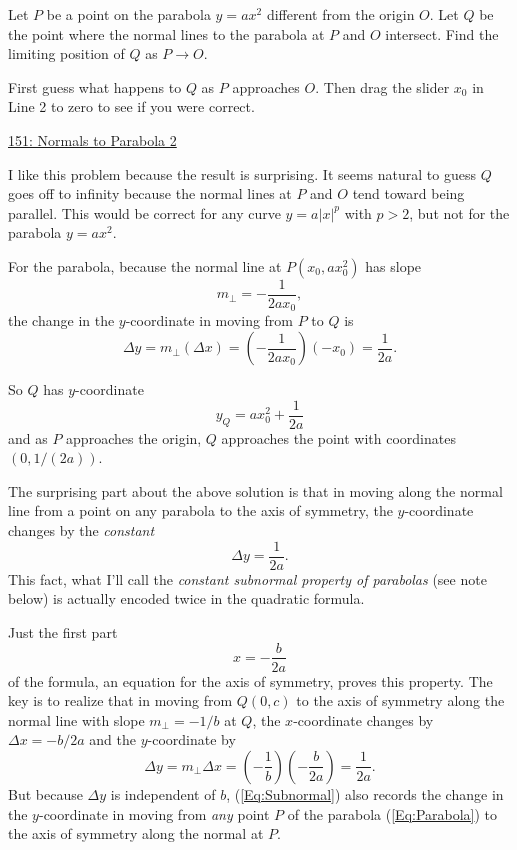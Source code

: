 \documentclass{ximera}
\begin{document}
\begin{exercise}
Let $P$ be a point on the parabola $y=ax^2$ different from the origin $O$. Let $Q$ be the point where the normal lines to the parabola at $P$ and $O$ intersect. Find the limiting position of $Q$ as $P\to O$.

\begin{exploration}
First guess what happens to $Q$ as $P$ approaches $O$. Then drag the slider $x_0$ in Line 2 to zero to see if you were correct.
\begin{onlineOnly}
    \begin{center}
\end{center}
\end{onlineOnly}

\href{https://www.desmos.com/calculator/wuazgkeukm}{151: Normals to Parabola 2}
\end{exploration}

\begin{explanation}
I like this problem because the result is surprising. It seems natural to guess $Q$ goes off to infinity because the normal lines at $P$ and $O$ tend toward being parallel. This would be correct for any curve $y=a|x|^p$ with $p>2$, but not for the parabola $y=ax^2$.

For the parabola, because the normal line at $P(x_0,ax_0^2)$ has slope
\[
        m_\perp = -\frac{1}{2ax_0} ,
\] 
the change in the $y$-coordinate in moving from $P$ to $Q$ is %
\[
 \Delta y =  m_\perp (\Delta x) =  \left( -\frac{1}{2ax_0}\right)(-x_0)  = \frac{1}{2a} .
\]

So $Q$ has $y$-coordinate
\[
     y_Q = ax_0^2 + \frac{1}{2a}
\]
and as $P$ approaches the origin, $Q$ approaches the point with coordinates $(0,1/(2a))$.
\end{explanation}
\end{exercise}

The surprising part about the above solution is that in moving along the normal line from a point on any parabola to the axis of symmetry, the $y$-coordinate changes by the \emph{constant}
\[
   \Delta y = \frac{1}{2a} .
\]
This fact, what I'll call the \emph{constant subnormal property of parabolas} (see note below) is actually encoded twice in the quadratic formula. 

Just the first part 
\[
    x = -\frac{b}{2a}
\]
of the formula, an equation for the axis of symmetry, proves this property. The key is to realize that in moving from $Q(0,c)$ to the axis of symmetry along the normal line with slope $m_\perp = -1/b$ at $Q$, the $x$-coordinate changes by $\Delta x = -b/2a$ and the $y$-coordinate by
\begin{equation}
 \Delta y = m_\perp \Delta x = \left( -\frac{1}{b}\right) \left(- \frac{b}{2a}  \right)= \frac{1}{2a} .  \label{Eq:Subnormal}
\end{equation}
But because $\Delta y$ is independent of $b$, (\ref{Eq:Subnormal}) also records the change in the $y$-coordinate in moving from \emph{any} point $P$ of the parabola (\ref{Eq:Parabola}) to the axis of symmetry along the normal at $P$.
\end{document}
